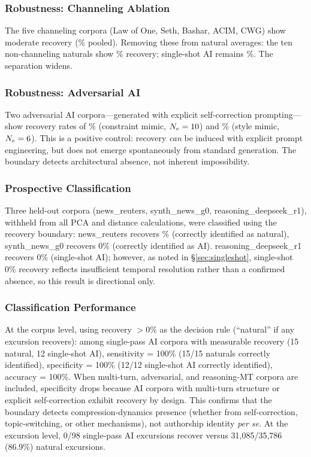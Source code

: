 \documentclass[11pt]{article}
\begin{document}
\subsubsection{Robustness: Channeling Ablation}

The five channeling corpora (Law of One, Seth, Bashar, ACIM, CWG) show moderate recovery (\recChannelingMean\% pooled). Removing these from natural averages: the ten non-channeling naturals show \recNaturalNonChanneling\% recovery; single-shot AI remains \recAISingleShot\%. The separation widens.

\subsubsection{Robustness: Adversarial AI}

Two adversarial AI corpora---generated with explicit self-correction prompting---show recovery rates of \recAdvConstraint\% (constraint mimic, $N_e = 10$) and \recAdvStyle\% (style mimic, $N_e = 6$). This is a positive control: recovery \textit{can} be induced with explicit prompt engineering, but does not emerge spontaneously from standard generation. The boundary detects architectural absence, not inherent impossibility.

\subsubsection{Prospective Classification}

Three held-out corpora (news\_reuters, synth\_news\_g0, reasoning\_deepseek\_r1), withheld from all PCA and distance calculations, were classified using the recovery boundary: news\_reuters recovers \recNewsReuters\% (correctly identified as natural), synth\_news\_g0 recovers 0\% (correctly identified as AI). reasoning\_deepseek\_r1 recovers 0\% (single-shot AI); however, as noted in \S\ref{sec:singleshot}, single-shot 0\% recovery reflects insufficient temporal resolution rather than a confirmed absence, so this result is directional only.

\subsubsection{Classification Performance}

At the corpus level, using recovery $> 0\%$ as the decision rule (``natural'' if any excursion recovers): among single-pass AI corpora with measurable recovery (15 natural, 12 single-shot AI), sensitivity = 100\% (15/15 naturals correctly identified), specificity = 100\% (12/12 single-shot AI correctly identified), accuracy = 100\%. When multi-turn, adversarial, and reasoning-MT corpora are included, specificity drops because AI corpora with multi-turn structure or explicit self-correction exhibit recovery by design. This confirms that the boundary detects compression-dynamics presence (whether from self-correction, topic-switching, or other mechanisms), not authorship identity \textit{per se}. At the excursion level, 0/98 single-pass AI excursions recover versus 31,085/35,786 (86.9\%) natural excursions.
\end{document}
